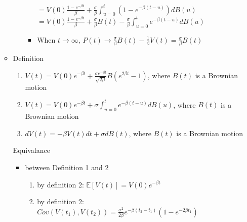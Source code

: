 \documentclass[a4paper]{article}
\begin{document}
\begin{itemize}
\begin{itemize}
\begin{enumerate}
\begin{itemize}
                                $= V(0) \frac{1 - e^{-\beta t}}{\beta} + \frac{\sigma}{\beta} \int_{u=0}^t (1 - e^{-\beta (t-u)}) d B(u)$
                                $= V(0) \frac{1 - e^{-\beta t}}{\beta} + \frac{\sigma}{\beta} B(t) - \frac{\sigma}{\beta} \int_{u=0}^t e^{-\beta (t-u)} d B(u)$
                            \item When $t \rightarrow \infty$, $P(t) \rightarrow \frac{\sigma}{\beta} B(t) - \frac{1}{\beta}V(t) = \frac{\sigma}{\beta} B(t)$
                        \end{itemize}
                \end{enumerate}
            \item Definition
                \begin{enumerate}
                    \item $V(t) = V(0) e^{-\beta t} + \frac{\sigma e^{-\beta t}}{\sqrt{2\beta }} B(e^{2\beta t} - 1)$, where $B(t)$ is a Brownian motion
                    \item $V(t) = V(0) e^{-\beta t} + \sigma \int_{u=0}^t e^{-\beta (t-u)} d B(u)$, where $B(t)$ is a Brownian motion
                    \item $dV(t) = -\beta V(t) dt + \sigma d B(t)$, where $B(t)$ is a Brownian motion
                \end{enumerate}
                Equivalance
                \begin{itemize}
                    \item between Definition 1 and 2
                        \begin{enumerate}
                            \item by definition 2: $\mathbb{E}[V(t)] = V(0) e^{-\beta t}$
                            \item by definition 2: $\mathit{Cov}(V(t_1), V(t_2)) = \frac{\sigma^2}{2\beta} e^{-\beta(t_2 - t_1)} (1 - e^{-2\beta t_1})$


\end{enumerate}
\end{itemize}
\end{itemize}
\end{itemize}
\end{document}
